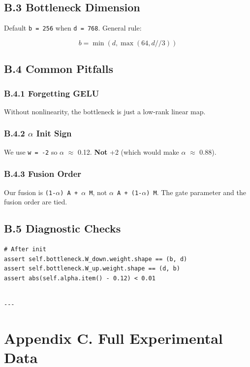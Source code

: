 \subsection{B.3 Bottleneck Dimension}

Default \texttt{b = 256} when \texttt{d = 768}. General rule:

\[
b = \min(d, \max(64, d // 3))
\tag{B.1}
\]

\subsection{B.4 Common Pitfalls}

\subsubsection{B.4.1 Forgetting GELU}

Without nonlinearity, the bottleneck is just a low-rank linear map.

\subsubsection{B.4.2 $\alpha$ Init Sign}

We use \texttt{w  = -2} so $\alpha$  $\approx$ 0.12. \textbf{Not} +2 (which would make $\alpha$ $\approx$ 0.88).

\subsubsection{B.4.3 Fusion Order}

Our fusion is \texttt{(1-$\alpha$) A + $\alpha$ M}, not \texttt{$\alpha$ A + (1-$\alpha$) M}. The gate parameter 
and the fusion order are tied.

\subsection{B.5 Diagnostic Checks}

\begin{lstlisting}
# After init
assert self.bottleneck.W_down.weight.shape == (b, d)
assert self.bottleneck.W_up.weight.shape == (d, b)
assert abs(self.alpha.item() - 0.12) < 0.01
\end{lstlisting}
\begin{lstlisting}

---
\end{lstlisting}

\section{Appendix C. Full Experimental Data}

